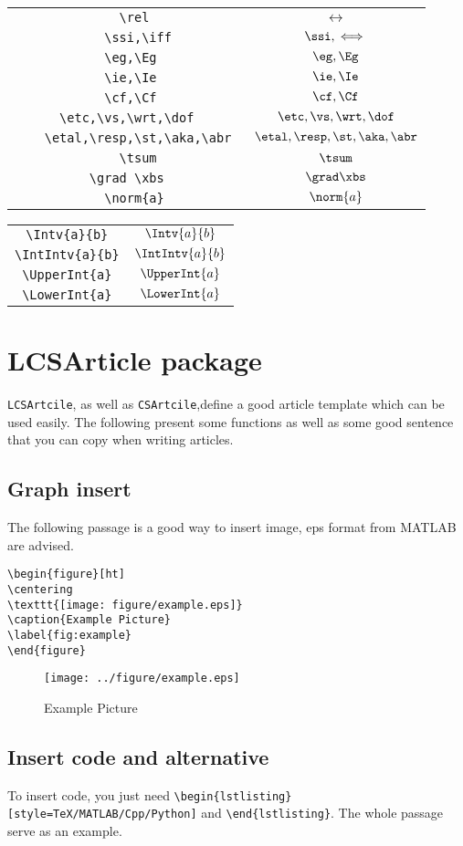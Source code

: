 \documentclass{CSArticle}[english]
\begin{document}
\begin{table}[h]
\begin{tabular}{|c|c|}
\verb|	  \rel 	| & $	  \rel 	$\\
\verb|	  \ssi,\iff	| & $	  \ssi,\iff	$\\
\verb|	  \eg,\Eg	| & $	  \eg,\Eg	$\\
\verb|	  \ie,\Ie	| & $	  \ie,\Ie	$\\
\verb|	  \cf,\Cf	| & $	  \cf,\Cf	$\\
\verb|	  \etc,\vs,\wrt,\dof	| & $	  \etc,\vs,\wrt,\dof	$\\
\verb|	  \etal,\resp,\st,\aka,\abr	| & $	  \etal,\resp,\st,\aka,\abr	$\\
\verb|	  \tsum	| & $	  \tsum	$\\
\verb|	  \grad \xbs	| & $	  \grad \xbs	$\\
\verb|	  \norm{a}	| & $	  \norm{a}	$\\

\hline
\end{tabular}
\end{table}
\begin{table}[h]
\centering
\begin{tabular}{|c|c|}
\hline
\verb|\Intv{a}{b}|&$\Intv{a}{b}$\\
\verb|\IntIntv{a}{b}|&$\IntIntv{a}{b}$\\
\verb|\UpperInt{a}|&$\UpperInt{a}$\\
\verb|\LowerInt{a}|&$\LowerInt{a}$\\
\hline
\end{tabular}
\end{table}
\newpage
\section{LCSArticle package}
\verb|LCSArtcile|, as well as \verb|CSArtcile|,define a good article template which can be used easily. The following present some functions as well as some good sentence that you can copy when writing articles.
\subsection{Graph insert}
The following passage is a good way to insert image, eps format from MATLAB are advised. 
\begin{lstlisting}[style=TeX]
\begin{figure}[ht]
\centering
\texttt{[image: figure/example.eps]}
\caption{Example Picture}
\label{fig:example}
\end{figure}
\end{lstlisting}
\begin{figure}[ht]
\centering
\texttt{[image: ../figure/example.eps]}
\caption{Example Picture}
\label{fig:example}
\end{figure}
\subsection{Insert code and alternative}
To insert code, you just need \verb|\begin{lstlisting}[style=TeX/MATLAB/Cpp/Python]| and \verb|\end{lstlisting}|. The whole passage serve as an example.
\end{document}
